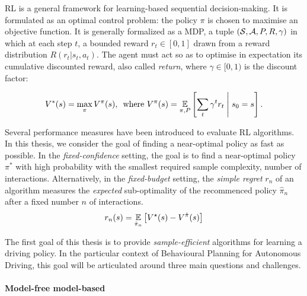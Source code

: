 \ac{RL} is a general framework for learning-based sequential decision-making. It is formulated as an optimal control problem: the policy $\pi$ is chosen to maximise an objective function. It is generally formalized as a \ac{MDP}, \ie a tuple $(\mathcal{S}, \mathcal{A}, P, R, \gamma)$ in which at each step $t$, a bounded reward $r_t\in[0, 1]$ drawn from a reward distribution $R(r_t|s_t,a_t)$. The agent must act so as to optimise in expectation its cumulative discounted reward, also called \emph{return}, where $\gamma\in[0,1)$ is the discount factor:

\begin{equation*}
V^*(s) = \max_{\pi}V^\pi(s),\, \text{ where } V^\pi(s) = \operatorname*{\mathbb{E}}_{\pi, P} \left[\sum_t \gamma^t r_t\;\middle|\; s_0 = s\right].
\end{equation*}

Several performance measures have been introduced to evaluate \ac*{RL} algorithms. In this thesis, we consider the goal of finding a near-optimal policy as fast as possible. In the \emph{fixed-confidence} setting, the goal is to find a near-optimal policy $\pi^*$ with high probability with the smallest required sample complexity, \ie number of interactions. Alternatively, in the \emph{fixed-budget} setting, the \emph{simple regret} $r_n$ of an algorithm measures the \emph{expected} sub-optimality of the recommenced policy $\hat{\pi}_n$ after a fixed number $n$ of interactions.
\begin{equation*}
r_n(s) = \operatorname*{\mathbb{E}}_{\hat{\pi}_n} \left[ V^\star(s) - V^{\hat{\pi}}(s) \right]
\end{equation*}


The first goal of this thesis is to provide \emph{sample-efficient} algorithms for learning a driving policy. In the particular context of Behavioural Planning for Autonomous Driving, this goal will be articulated around three main questions and challenges.

\paragraph{Model-free \vs model-based}

